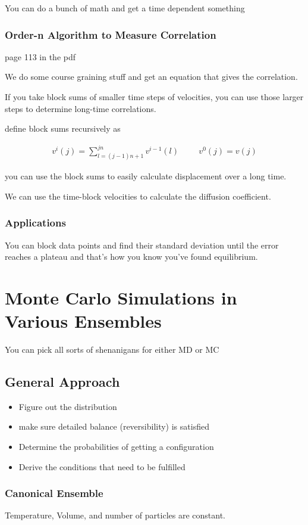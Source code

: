 \documentclass[fleqn]{report}
\newcommand{\hp}{\hspace{1cm}}
\newcommand{\equations} [1] {
\begin{gather*}
#1
\end{gather*}
}
\begin{document}
You can do a bunch of math and get a time dependent something 

\subsection{Order-n Algorithm to Measure Correlation}
page 113 in the pdf

We do some course graining stuff and get an equation that 
gives the correlation. 

If you take block sums of smaller time steps of velocities, you 
can use those larger steps to determine long-time correlations. 

define block sums recursively as 

\equations{
    v^{i}(j) = \sum^{jn}_{l = (j - 1)n + 1} v^{i - 1}(l)
    \hp 
    v^0(j) = v(j)
}

you can use the block sums to easily calculate displacement over a long 
time.

We can use the time-block velocities to calculate the diffusion coefficient. 


\subsection{Applications}
You can block data points and find their standard deviation until the 
error reaches a plateau and that's how you know you've found equilibrium. 


\chapter{Monte Carlo Simulations in Various Ensembles}
You can pick all sorts of shenanigans for either MD or MC 

\section{General Approach}
\begin{itemize}
    \item 
    Figure out the distribution 
    \item 
    make sure detailed balance (reversibility) is satisfied
    \item 
    Determine the probabilities of getting a configuration 
    \item 
    Derive the conditions that need to be fulfilled 
\end{itemize}

\subsection{Canonical Ensemble}
Temperature, Volume, and number of particles are constant. 
\end{document}
